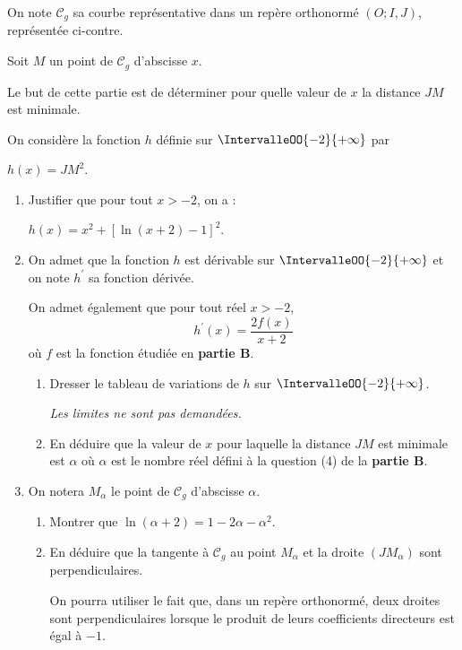 On note $\mathcal{C}_{g}$ sa courbe représentative dans un repère orthonormé $(O;I,J)$, représentée ci-contre.


\smallskip

Soit $M$ un point de $\mathcal{C}_{g}$ d'abscisse $x$.

\smallskip

Le but de cette partie est de déterminer pour quelle valeur de $x$ la distance $JM$ est minimale.

\smallskip

On considère la fonction $h$ définie sur $\IntervalleOO{-2}{+\infty}$ par

$h(x)=JM^{2}$.

\begin{enumerate}
	\item Justifier que pour tout $x>-2$, on a :
	
	$h(x)=x^{2}+[\ln (x+2)-1]^{2}$.
	\item On admet que la fonction $h$ est dérivable sur $\IntervalleOO{-2}{+\infty}$ et on note $h^{\prime}$ sa fonction dérivée.
	
	On admet également que pour tout réel $x>-2$, \[ h^{\prime}(x)=\frac{2 f(x)}{x+2} \]
	où $f$ est la fonction étudiée en \textbf{partie B}.

	\begin{enumerate}
		\item Dresser le tableau de variations de $h$ sur $\IntervalleOO{-2}{+\infty}$.
		
		\textit{Les limites ne sont pas demandées.}
		\item En déduire que la valeur de $x$ pour laquelle la distance $JM$ est minimale est $\alpha$ où $\alpha$ est le nombre réel défini à la question (4) de la \textbf{partie B}.
	\end{enumerate}
	\item On notera $M_{\alpha}$ le point de $\mathcal{C}_{g}$ d'abscisse $\alpha$.
	
	\begin{enumerate}
		\item Montrer que $\ln(\alpha+2)=1-2\alpha-\alpha^{2}$.
		\item En déduire que la tangente à $\mathcal{C}_{g}$ au point $M_{\alpha}$ et la droite $\left(JM_{\alpha}\right)$ sont perpendiculaires.
		
		On pourra utiliser le fait que, dans un repère orthonormé, deux droites sont perpendiculaires lorsque le produit de leurs coefficients directeurs est égal à $-1$.
	\end{enumerate}
\end{enumerate}